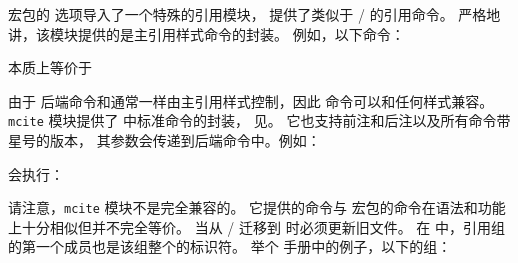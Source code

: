 
宏包的  选项导入了一个特殊的引用模块，
提供了类似于 \slash{} 的引用命令。
严格地讲，该模块提供的是主引用样式命令的封装。
例如，以下命令：

\begin{ltxexample}
\end{ltxexample}
%
本质上等价于

\begin{ltxexample}
%
%
\cite{key1,setA,key2,setB}
\end{ltxexample}
%
由于  后端命令和通常一样由主引用样式控制，因此  命令可以和任何样式兼容。
\texttt{mcite} 模块提供了  中标准命令的封装，
见。
它也支持前注和后注以及所有命令带星号的版本，
其参数会传递到后端命令中。例如：

\begin{ltxexample}
\end{ltxexample}
%
会执行：

\begin{ltxexample}
%
\cite*[pre][post]{setA}
\end{ltxexample}
%
请注意，\texttt{mcite} 模块不是完全兼容的。
它提供的命令与  宏包的命令在语法和功能上十分相似但并不完全等价。
当从 \slash{} 迁移到 \biblatex 时必须更新旧文件。
在  中，引用组的第一个成员也是该组整个的标识符。
举个  手册中的例子，以下的组：

